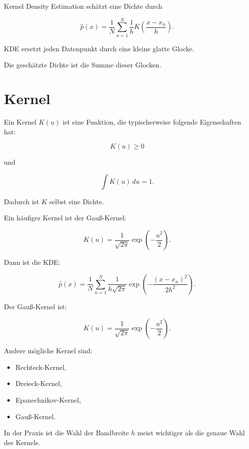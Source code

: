 \begin{definitionbox}
Kernel Density Estimation schätzt eine Dichte durch

\[
    \hat{p}(x)
    =
    \frac{1}{N}
    \sum_{n=1}^{N}
    \frac{1}{h}
    K
    \left(
        \frac{x-x_n}{h}
    \right).
\]
\end{definitionbox}

\begin{conceptbox}
KDE ersetzt jeden Datenpunkt durch eine kleine glatte Glocke.

Die geschätzte Dichte ist die Summe dieser Glocken.
\end{conceptbox}

\section{Kernel}

Ein Kernel \(K(u)\) ist eine Funktion, die typischerweise folgende Eigenschaften hat:

\[
    K(u)\geq 0
\]

und

\[
    \int K(u)\,du=1.
\]

Dadurch ist \(K\) selbst eine Dichte.

Ein häufiger Kernel ist der Gauß-Kernel:

\[
    K(u)
    =
    \frac{1}{\sqrt{2\pi}}
    \exp
    \left(
        -\frac{u^2}{2}
    \right).
\]

Dann ist die KDE:

\[
    \hat{p}(x)
    =
    \frac{1}{N}
    \sum_{n=1}^{N}
    \frac{1}{h\sqrt{2\pi}}
    \exp
    \left(
        -\frac{(x-x_n)^2}{2h^2}
    \right).
\]

\begin{definitionbox}
Der Gauß-Kernel ist:

\[
    K(u)
    =
    \frac{1}{\sqrt{2\pi}}
    \exp
    \left(
        -\frac{u^2}{2}
    \right).
\]
\end{definitionbox}

Andere mögliche Kernel sind:

\begin{itemize}
    \item Rechteck-Kernel,
    \item Dreieck-Kernel,
    \item Epanechnikov-Kernel,
    \item Gauß-Kernel.
\end{itemize}

\begin{notebox}
In der Praxis ist die Wahl der Bandbreite \(h\) meist wichtiger als die genaue Wahl des Kernels.
\end{notebox}


